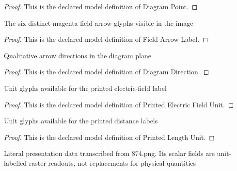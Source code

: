 \begin{proof}
  This is the declared model definition of Diagram Point.
\end{proof}
\begin{definition}
  \label{def:physics:phyx-mini-0874:phyxminiproblems-problemphyxmini0874-fieldarrowlabel}
  The six distinct magenta field-arrow glyphs visible in the image
\end{definition}
\begin{proof}
  This is the declared model definition of Field Arrow Label.
\end{proof}
\begin{definition}
  \label{def:physics:phyx-mini-0874:phyxminiproblems-problemphyxmini0874-diagramdirection}
  Qualitative arrow directions in the diagram plane
\end{definition}
\begin{proof}
  This is the declared model definition of Diagram Direction.
\end{proof}
\begin{definition}
  \label{def:physics:phyx-mini-0874:phyxminiproblems-problemphyxmini0874-printedelectricfieldunit}
  Unit glyphs available for the printed electric-field label
\end{definition}
\begin{proof}
  This is the declared model definition of Printed Electric Field Unit.
\end{proof}
\begin{definition}
  \label{def:physics:phyx-mini-0874:phyxminiproblems-problemphyxmini0874-printedlengthunit}
  Unit glyphs available for the printed distance labels
\end{definition}
\begin{proof}
  This is the declared model definition of Printed Length Unit.
\end{proof}
\begin{definition}
  \label{def:physics:phyx-mini-0874:phyxminiproblems-problemphyxmini0874-uniformelectricfieldfigure}
  Literal presentation data transcribed from 874.png. Its scalar fields are unit-labelled raster readouts, not replacements for physical quantities
\end{definition}
